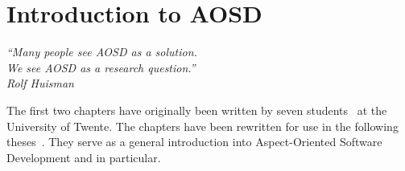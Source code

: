 \chapter{Introduction to AOSD}
\label{chp:AOSD}
\begin{flushright}
\textit{``Many people see AOSD as a solution.}\\
\textit{We see AOSD as a research question.''}\\
\textit{Rolf Huisman}\\
\end{flushright}

The first two chapters have originally been written by seven \MSc students~\cite{Holljen2004, Durr2004, Vinkes2004, Bosman2004, Staijen2005, Havinga2005, Boschman2006} at the University of Twente.
The chapters have been rewritten for use in the following theses~\cite{VanOudheusden2006, Conradi2006, TeWinkel2006, Huttenhuis2006, Doornenbal2006, Huisman2006, SpenkelinkD2006}.
They serve as a general introduction into Aspect-Oriented Software Development and \Compose* in particular.



